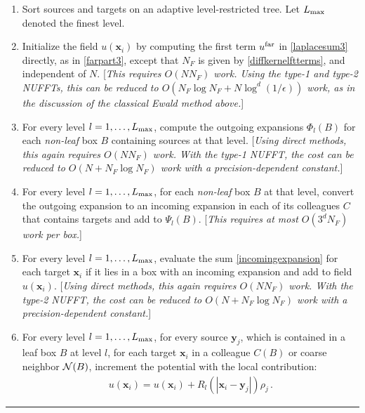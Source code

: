 \documentclass[final,letterpaper]{siamart171218}
\newcommand{\be}{\begin{equation}}
\newcommand{\ee}{\end{equation}}
\newcommand{\ba}{\begin{aligned}}
\newcommand{\ea}{\end{aligned}}
\newcommand{\x}{\boldsymbol{x}}
\newcommand{\y}{\boldsymbol{y}}
\begin{document}
\begin{enumerate}[label=(\roman*).]
\item
Sort sources and targets on an adaptive level-restricted tree.
Let $L_{\rm max}$ denoted the finest level.

\item
Initialize the field $u(\x_i)$ by computing
the first term $u^{\rm far}$ 
in \cref{laplacesum3} directly, as in 
\cref{farpart3}, except that $N_F$ is given by 
\cref{diffkernelftterms}, and independent of $N$.
[{\em This requires $O(N N_F)$ work.
Using the type-1 and type-2 NUFFTs, this can be reduced to
$O(N_F\log N_F + N \log^d(1/\epsilon))$ work, as in the discussion of the classical
Ewald method above.}]

\item  For every level $l=1,\dots,L_{\rm max}$,
compute the outgoing expansions $\Phi_{l}(B)$ for
  each {\em non-leaf} box $B$ containing sources at that level. [{\em Using direct methods,
this again requires $O(NN_F)$ work. With the type-1 NUFFT, the cost can be reduced to 
$O(N + N_F \log N_F)$ work with a precision-dependent constant.}]
 
\item  For every level $l=1,\dots,L_{\rm max}$,
for each {\em non-leaf} box $B$ at that level, convert the 
outgoing expansion to an incoming expansion in each of its colleagues $C$ that contains
targets and add to $\Psi_{l}(B)$. 
[{\em This requires at most $O(3^d N_F)$ work per box.}]

\item  For every level $l=1,\dots,L_{\rm max}$,
evaluate the sum \eqref{incomingexpansion}
for each target $\x_i$ if it lies in a box with an incoming expansion and add to 
field $u(\x_i)$.
[{\em Using direct methods, this again requires $O(NN_F)$ work. 
With the type-2 NUFFT, the cost can be reduced to 
$O(N + N_F \log N_F)$ work with a precision-dependent constant.}]

\item  For every level $l=1,\dots,L_{\rm max}$,
for every source $\y_j$, which is contained in a leaf box $B$ at level $l$, 
for each target $\x_i$ in a colleague $C(B)$ or coarse neighbor ${\cal N}(B)$, 
increment the potential with the local contribution:
\be
\ba
u(\x_i) = u(\x_i) +
R_l(|\x_i-\y_j|)\rho_j  \, .
\ea
\ee
\end{enumerate}

\vspace{.2in}
\hrule
\vspace{.2in}
\end{document}
